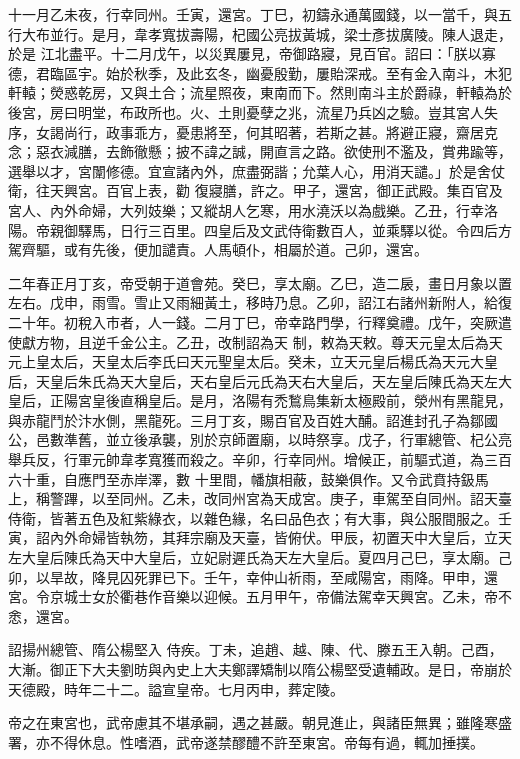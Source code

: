 \begin{pinyinscope}
 十一月乙未夜，行幸同州。壬寅，還宮。丁巳，初鑄永通萬國錢，以一當千，與五行大布並行。是月，韋孝寬拔壽陽，杞國公亮拔黃城，梁士彥拔廣陵。陳人退走，於是
 江北盡平。十二月戊午，以災異屢見，帝御路寢，見百官。詔曰：「朕以寡德，君臨區宇。始於秋季，及此玄冬，幽憂殷勤，屢貽深戒。至有金入南斗，木犯軒轅；熒惑乾房，又與土合；流星照夜，東南而下。然則南斗主於爵祿，軒轅為於後宮，房曰明堂，布政所也。火、土則憂孽之兆，流星乃兵凶之驗。豈其宮人失序，女謁尚行，政事乖方，憂患將至，何其昭著，若斯之甚。將避正寢，齋居克念；惡衣減膳，去飾徹懸；披不諱之誠，開直言之路。欲使刑不濫及，賞弗踰等，選舉以才，宮闈修德。宜宣諸內外，庶盡弼諧；允葉人心，用消天譴。」於是舍仗衛，往天興宮。百官上表，勸
 復寢膳，許之。甲子，還宮，御正武殿。集百官及宮人、內外命婦，大列妓樂；又縱胡人乞寒，用水澆沃以為戲樂。乙丑，行幸洛陽。帝親御驛馬，日行三百里。四皇后及文武侍衛數百人，並乘驛以從。令四后方駕齊驅，或有先後，便加譴責。人馬頓仆，相屬於道。己卯，還宮。



 二年春正月丁亥，帝受朝于道會苑。癸巳，享太廟。乙巳，造二扆，畫日月象以置左右。戊申，雨雪。雪止又雨細黃土，移時乃息。乙卯，詔江右諸州新附人，給復二十年。初稅入市者，人一錢。二月丁巳，帝幸路門學，行釋奠禮。戊午，突厥遣使獻方物，且逆千金公主。乙丑，改制詔為天
 制，敕為天敕。尊天元皇太后為天元上皇太后，天皇太后李氏曰天元聖皇太后。癸未，立天元皇后楊氏為天元大皇后，天皇后朱氏為天大皇后，天右皇后元氏為天右大皇后，天左皇后陳氏為天左大皇后，正陽宮皇後直稱皇后。是月，洛陽有禿鶖鳥集新太極殿前，滎州有黑龍見，與赤龍鬥於汴水側，黑龍死。三月丁亥，賜百官及百姓大酺。詔進封孔子為鄒國公，邑數準舊，並立後承襲，別於京師置廟，以時祭享。戊子，行軍總管、杞公亮舉兵反，行軍元帥韋孝寬獲而殺之。辛卯，行幸同州。增候正，前驅式道，為三百六十重，自應門至赤岸澤，數
 十里間，幡旗相蔽，鼓樂俱作。又令武賁持鈒馬上，稱警蹕，以至同州。乙未，改同州宮為天成宮。庚子，車駕至自同州。詔天臺侍衛，皆著五色及紅紫綠衣，以雜色緣，名曰品色衣；有大事，與公服間服之。壬寅，詔內外命婦皆執笏，其拜宗廟及天臺，皆俯伏。甲辰，初置天中大皇后，立天左大皇后陳氏為天中大皇后，立妃尉遲氏為天左大皇后。夏四月己巳，享太廟。己卯，以旱故，降見囚死罪已下。壬午，幸仲山祈雨，至咸陽宮，雨降。甲申，還宮。令京城士女於衢巷作音樂以迎候。五月甲午，帝備法駕幸天興宮。乙未，帝不悆，還宮。



 詔揚州總管、隋公楊堅入
 侍疾。丁未，追趙、越、陳、代、滕五王入朝。己酉，大漸。御正下大夫劉昉與內史上大夫鄭譯矯制以隋公楊堅受遺輔政。是日，帝崩於天德殿，時年二十二。謚宣皇帝。七月丙申，葬定陵。



 帝之在東宮也，武帝慮其不堪承嗣，遇之甚嚴。朝見進止，與諸臣無異；雖隆寒盛署，亦不得休息。性嗜酒，武帝遂禁醪醴不許至東宮。帝每有過，輒加捶撲。




\end{pinyinscope}
